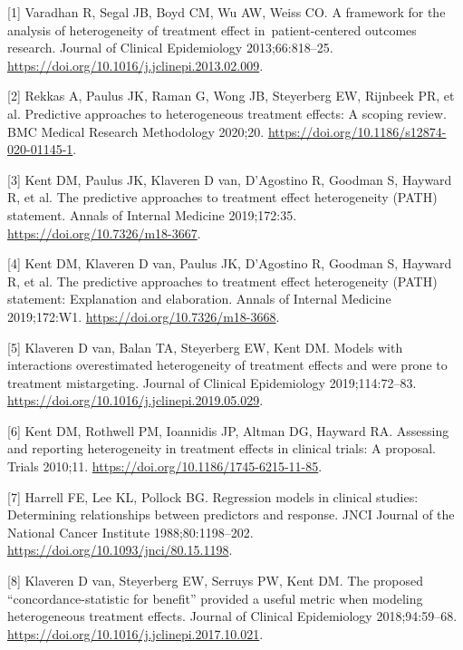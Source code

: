 \documentclass{article}
\newenvironment{cslreferences}%
  {}%
  {\par}
\begin{document}
\hypertarget{refs}{}
\begin{cslreferences}
\leavevmode\hypertarget{ref-Varadhan2013}{}%
{[}1{]} Varadhan R, Segal JB, Boyd CM, Wu AW, Weiss CO. A framework for
the analysis of heterogeneity of treatment effect in~patient-centered
outcomes research. Journal of Clinical Epidemiology 2013;66:818--25.
\url{https://doi.org/10.1016/j.jclinepi.2013.02.009}.

\leavevmode\hypertarget{ref-Rekkas2020}{}%
{[}2{]} Rekkas A, Paulus JK, Raman G, Wong JB, Steyerberg EW, Rijnbeek
PR, et al. Predictive approaches to heterogeneous treatment effects: A
scoping review. BMC Medical Research Methodology 2020;20.
\url{https://doi.org/10.1186/s12874-020-01145-1}.

\leavevmode\hypertarget{ref-Kent2019}{}%
{[}3{]} Kent DM, Paulus JK, Klaveren D van, D'Agostino R, Goodman S,
Hayward R, et al. The predictive approaches to treatment effect
heterogeneity (PATH) statement. Annals of Internal Medicine 2019;172:35.
\url{https://doi.org/10.7326/m18-3667}.

\leavevmode\hypertarget{ref-PathEnE}{}%
{[}4{]} Kent DM, Klaveren D van, Paulus JK, D'Agostino R, Goodman S,
Hayward R, et al. The predictive approaches to treatment effect
heterogeneity (PATH) statement: Explanation and elaboration. Annals of
Internal Medicine 2019;172:W1. \url{https://doi.org/10.7326/m18-3668}.

\leavevmode\hypertarget{ref-vanKlaveren2019}{}%
{[}5{]} Klaveren D van, Balan TA, Steyerberg EW, Kent DM. Models with
interactions overestimated heterogeneity of treatment effects and were
prone to treatment mistargeting. Journal of Clinical Epidemiology
2019;114:72--83. \url{https://doi.org/10.1016/j.jclinepi.2019.05.029}.

\leavevmode\hypertarget{ref-Kent2010}{}%
{[}6{]} Kent DM, Rothwell PM, Ioannidis JP, Altman DG, Hayward RA.
Assessing and reporting heterogeneity in treatment effects in clinical
trials: A proposal. Trials 2010;11.
\url{https://doi.org/10.1186/1745-6215-11-85}.

\leavevmode\hypertarget{ref-Harrell1988}{}%
{[}7{]} Harrell FE, Lee KL, Pollock BG. Regression models in clinical
studies: Determining relationships between predictors and response. JNCI
Journal of the National Cancer Institute 1988;80:1198--202.
\url{https://doi.org/10.1093/jnci/80.15.1198}.

\leavevmode\hypertarget{ref-vanKlaveren2018}{}%
{[}8{]} Klaveren D van, Steyerberg EW, Serruys PW, Kent DM. The proposed
``concordance-statistic for benefit'' provided a useful metric when
modeling heterogeneous treatment effects. Journal of Clinical
Epidemiology 2018;94:59--68.
\url{https://doi.org/10.1016/j.jclinepi.2017.10.021}.


\end{cslreferences}
\end{document}

